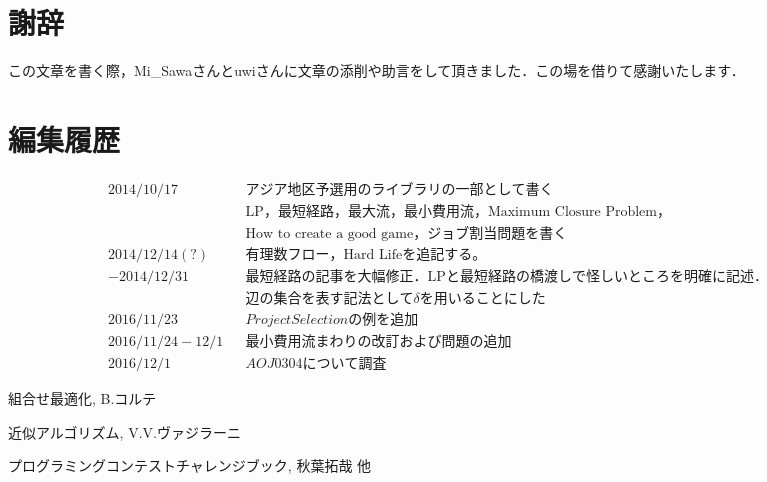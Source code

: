 \documentclass[13pt]{jarticle}
\theoremstyle{nonitalic} %
\begin{document}
\section*{謝辞}
この文章を書く際，Mi\_Sawaさんとuwiさんに文章の添削や助言をして頂きました．この場を借りて感謝いたします．

\section*{編集履歴}
\begin{align*}
  &&& 2014/10/17 && アジア地区予選用のライブラリの一部として書く &&&\\
  &&&            && \mathrm{LP}， 最短経路， 最大流， 最小費用流， \textrm{Maximum Closure Problem}， \\
  &&&            &&\textrm{How to create a good game}， ジョブ割当問題を書く \\
  &&& 2014/12/14(?) && 有理数フロー， \textrm{Hard Life}を追記する。 \\
  &&& -2014/12/31    && 最短経路の記事を大幅修正．\textrm{LP}と最短経路の橋渡しで怪しいところを明確に記述．\\
  &&&               && 辺の集合を表す記法として \delta を用いることにした\\
  &&& 2016/11/23 && Project Selectionの例を追加　\\
  &&& 2016/11/24-12/1 && 最小費用流まわりの改訂および問題の追加 \\
  &&& 2016/12/1 && AOJ0304について調査
\end{align*}

\begin{thebibliography}{99}
 組合せ最適化, B.コルテ

 近似アルゴリズム, V.V.ヴァジラーニ

 プログラミングコンテストチャレンジブック, 秋葉拓哉 他

\end{thebibliography}
\end{document}
